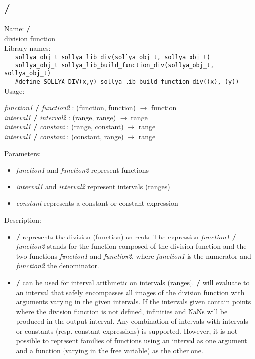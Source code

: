 \subsection{/}
\label{labdivide}
\noindent Name: \textbf{/}\\
\phantom{aaa}division function\\[0.2cm]
\noindent Library names:\\
\verb|   sollya_obj_t sollya_lib_div(sollya_obj_t, sollya_obj_t)|\\
\verb|   sollya_obj_t sollya_lib_build_function_div(sollya_obj_t, sollya_obj_t)|\\
\verb|   #define SOLLYA_DIV(x,y) sollya_lib_build_function_div((x), (y))|\\[0.2cm]
\noindent Usage: 
\begin{center}
\emph{function1} \textbf{/} \emph{function2} : (\textsf{function}, \textsf{function}) $\rightarrow$ \textsf{function}\\
\emph{interval1} \textbf{/} \emph{interval2} : (\textsf{range}, \textsf{range}) $\rightarrow$ \textsf{range}\\
\emph{interval1} \textbf{/} \emph{constant} : (\textsf{range}, \textsf{constant}) $\rightarrow$ \textsf{range}\\
\emph{interval1} \textbf{/} \emph{constant} : (\textsf{constant}, \textsf{range}) $\rightarrow$ \textsf{range}\\
\end{center}
Parameters: 
\begin{itemize}
\item \emph{function1} and \emph{function2} represent functions
\item \emph{interval1} and \emph{interval2} represent intervals (ranges)
\item \emph{constant} represents a constant or constant expression
\end{itemize}
\noindent Description: \begin{itemize}

\item \textbf{/} represents the division (function) on reals. 
   The expression \emph{function1} \textbf{/} \emph{function2} stands for
   the function composed of the division function and the two
   functions \emph{function1} and \emph{function2}, where \emph{function1} is
   the numerator and \emph{function2} the denominator.

\item \textbf{/} can be used for interval arithmetic on intervals
   (ranges). \textbf{/} will evaluate to an interval that safely
   encompasses all images of the division function with arguments
   varying in the given intervals. If the intervals given contain points
   where the division function is not defined, infinities and NaNs will be
   produced in the output interval.  Any combination of intervals with
   intervals or constants (resp. constant expressions) is
   supported. However, it is not possible to represent families of
   functions using an interval as one argument and a function (varying in
   the free variable) as the other one.
\end{itemize}
